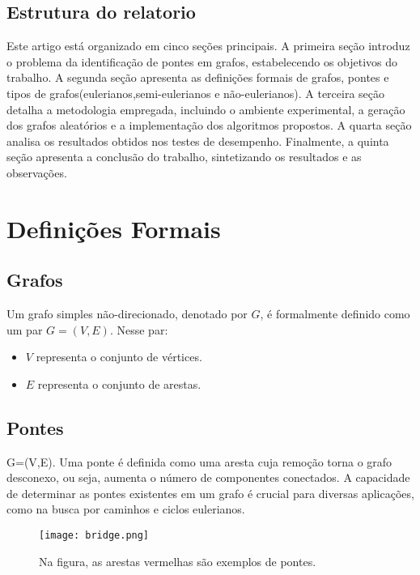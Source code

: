 \documentclass[12pt]{article}
\begin{document}
\subsection{Estrutura do relatorio}

Este artigo está organizado em cinco seções principais. A primeira seção introduz o problema da identificação de pontes em grafos, estabelecendo os objetivos do trabalho. A segunda seção apresenta as definições formais de grafos, pontes e tipos de grafos(eulerianos,semi-eulerianos e não-eulerianos). A terceira seção detalha a metodologia empregada, incluindo o ambiente experimental, a geração dos grafos aleatórios e a implementação dos algoritmos propostos. A quarta seção analisa os resultados obtidos nos testes de desempenho. Finalmente, a quinta seção apresenta a conclusão do trabalho, sintetizando os resultados e as observações.

\section{Definições Formais}
\subsection{Grafos}

Um grafo simples n\~ao-direcionado, denotado por $G$, \'e formalmente definido como um par $G=(V,E)$. Nesse par:

\begin{itemize}
    \item $V$ representa o conjunto de v\'ertices.
    \item $E$ representa o conjunto de arestas.
\end{itemize}


\subsection{Pontes}

G=(V,E). Uma ponte é definida como uma aresta cuja remoção torna o grafo desconexo, ou seja, aumenta o número de componentes conectados. A capacidade de determinar as pontes existentes em um grafo é crucial para diversas aplicações, como na busca por caminhos e ciclos eulerianos.

\begin{figure}[ht]
\centering
\texttt{[image: bridge.png]}
\caption{Na figura, as arestas vermelhas são exemplos de pontes.}
\label{fig:exampleFig2}
\end{figure}
\end{document}
